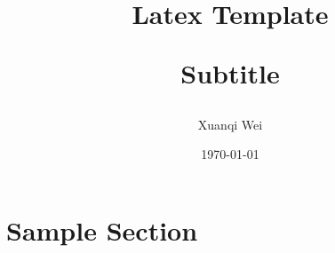 \documentclass[12pt]{article}
\title{Latex Template \\
\begin{large} 
  Subtitle
\end{large} 
}
\author{Xuanqi Wei}
\date{\today}
\begin{document}
\maketitle
\thispagestyle{empty}

\newpage

\tableofcontents
\thispagestyle{empty}

\newpage

\setcounter{page}{1}

\section{Sample Section}
\end{document}

